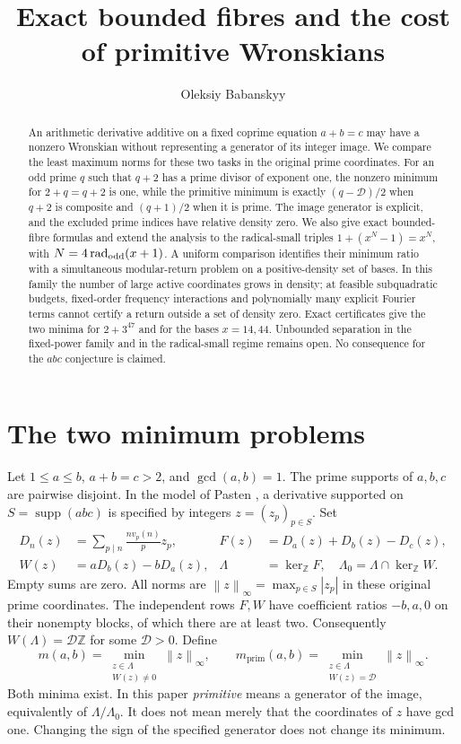 \documentclass[11pt,a4paper]{article}
\title{Exact bounded fibres and the cost of primitive Wronskians}
\author{Oleksiy Babanskyy}
\date{}
\theoremstyle{definition}\newtheorem{question}[theorem]{Question}
\theoremstyle{remark}\newtheorem{remark}[theorem]{Remark}
\newcommand{\Z}{\mathbb Z}\newcommand{\R}{\mathbb R}
\newcommand{\Dgen}{\mathcal D}\newcommand{\mpr}{m_{\mathrm{prim}}}
\newcommand{\norm}[1]{\left\lVert#1\right\rVert_\infty}
\DeclareMathOperator{\rad}{rad}\DeclareMathOperator{\supp}{supp}
\begin{document}
\maketitle
\begin{abstract}
An arithmetic derivative additive on a fixed coprime equation $a+b=c$
may have a nonzero Wronskian without representing a generator of its
integer image. We compare the least maximum norms for these two tasks
in the original prime coordinates. For an odd prime $q$ such that
$q+2$ has a prime divisor of exponent one, the nonzero minimum for
$2+q=q+2$ is one, while the primitive minimum is exactly
$(q-\Dgen)/2$ when $q+2$ is composite and $(q+1)/2$ when it is prime.
The image generator is explicit, and the excluded prime indices have
relative density zero. We also give exact bounded-fibre formulas and
extend the analysis to the radical-small triples $1+(x^N-1)=x^N$,
with $N=4\rad_{\rm odd}(x+1)$. A uniform comparison identifies their
minimum ratio with a simultaneous modular-return problem on a
positive-density set of bases. In this family the number of large
active coordinates grows in density; at feasible subquadratic budgets,
fixed-order frequency interactions and polynomially many explicit
Fourier terms cannot certify a return outside a set of density zero. Exact certificates give
the two minima for $2+3^{47}$ and for the bases $x=14,44$.
Unbounded separation in the fixed-power family and in the radical-small
regime remains open. No consequence for the $abc$ conjecture is claimed.
\end{abstract}

\section{The two minimum problems}\label{sec:intro}
Let $1\le a\le b$, $a+b=c>2$, and $\gcd(a,b)=1$. The prime supports
of $a,b,c$ are pairwise disjoint. In the model of Pasten
\cite[Sections 2.2 and 2.4]{Pasten}, a derivative supported on
$S=\supp(abc)$ is specified by integers $z=(z_p)_{p\in S}$. Set
\begin{align}
 D_n(z)&=\sum_{p\mid n}\frac{n v_p(n)}p z_p,&
 F(z)&=D_a(z)+D_b(z)-D_c(z),\label{eq:model}\\
 W(z)&=aD_b(z)-bD_a(z),&
 \Lambda&=\ker_{\Z}F,\quad \Lambda_0=\Lambda\cap\ker_{\Z}W.\nonumber
\end{align}
Empty sums are zero. All norms are $\norm{z}=\max_{p\in S}|z_p|$
in these original prime coordinates. The independent rows $F,W$ have
coefficient ratios $-b,a,0$ on their nonempty blocks, of which there
are at least two. Consequently $W(\Lambda)=\Dgen\Z$ for some
$\Dgen>0$. Define
\begin{equation}\label{eq:minima}
 m(a,b)=\min_{\substack{z\in\Lambda\\W(z)\ne0}}\norm{z},\qquad
 \mpr(a,b)=\min_{\substack{z\in\Lambda\\W(z)=\Dgen}}\norm{z}.
\end{equation}
Both minima exist. In this paper \emph{primitive} means a generator
of the image, equivalently of $\Lambda/\Lambda_0$. It does not mean
merely that the coordinates of $z$ have gcd one. Changing the sign of
the specified generator does not change its minimum.
\end{document}
